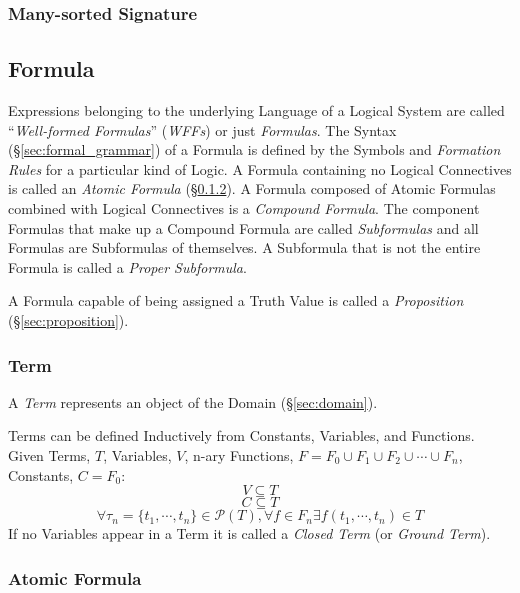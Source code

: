 \subsubsection{Many-sorted Signature}\label{sec:many_sorted_signature}



\subsection{Formula}\label{sec:formula}

Expressions belonging to the underlying Language of a Logical System
are called ``\emph{Well-formed Formulas}'' (\emph{WFFs}) or just
\emph{Formulas}. The Syntax (\S\ref{sec:formal_grammar}) of a Formula
is defined by the Symbols and \emph{Formation Rules} for a particular
kind of Logic. A Formula containing no Logical Connectives is called
an \emph{Atomic Formula} (\S\ref{sec:atomic_formula}). A Formula
composed of Atomic Formulas combined with Logical Connectives is a
\emph{Compound Formula}. The component Formulas that make up a
Compound Formula are called \emph{Subformulas} and all Formulas are
Subformulas of themselves. A Subformula that is not the entire Formula
is called a \emph{Proper Subformula}.

A Formula capable of being assigned a Truth Value is called a
\emph{Proposition} (\S\ref{sec:proposition}).



\subsubsection{Term}\label{sec:term}

A \emph{Term} represents an object of the Domain (\S\ref{sec:domain}).

Terms can be defined Inductively from Constants, Variables, and
Functions. Given Terms, $T$, Variables, $V$, n-ary Functions, $F = F_0
\cup F_1 \cup F_2 \cup \cdots \cup F_n$, Constants, $C = F_0$:
\[
    V \subseteq T
\]\[
    C \subseteq T
\]\[
    \forall \tau_n=\{t_1,\cdots,t_n\} \in \mathcal{P}(T), \forall f
    \in F_n \exists f(t_1,\cdots,t_n) \in T
\]
If no Variables appear in a Term it is called a \emph{Closed Term} (or
\emph{Ground Term}).



\subsubsection{Atomic Formula}\label{sec:atomic_formula}

